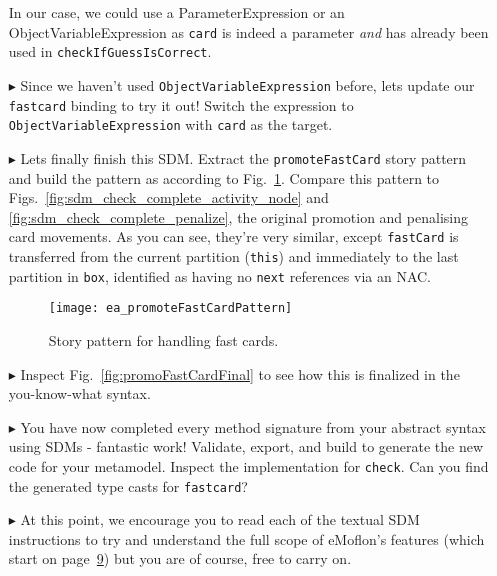 \begin{itemize}
In our case, we could use a ParameterExpression or an ObjectVariableExpression as \texttt{card} is indeed a parameter \emph{and} has already been used in
\texttt{checkIfGuessIsCorrect}. 

\vspace{0.5cm}

\item[$\blacktriangleright$] Since we haven't used \texttt{ObjectVariableExpression} before, lets update our \texttt{fastcard} binding to try it out! Switch
the expression to \texttt{Object\-Vari\-able\-Ex\-pres\-sion} with \texttt{card} as the target. 

\clearpage

\item[$\blacktriangleright$] Lets finally finish this SDM. Extract the \texttt{promoteFastCard} story pattern and build the pattern as according to
Fig.~\ref{fig:promoteFastCardPattern}. Compare this pattern to Figs.~\ref{fig:sdm_check_complete_activity_node} and \ref{fig:sdm_check_complete_penalize}, the
original promotion and penalising card movements. As you can see, they're very similar, except \texttt{fastCard} is transferred from the current partition
(\texttt{this}) and immediately to the last partition in \texttt{box}, identified as having no \texttt{next} references via an NAC.

\vspace{0.5cm}

\begin{figure}[htbp]
\begin{center}
  \texttt{[image: ea\_promoteFastCardPattern]}
  \caption{Story pattern for handling fast cards.}  
  \label{fig:promoteFastCardPattern}
\end{center}
\end{figure}

\vspace{0.5cm}

\item[$\blacktriangleright$] Inspect Fig.~\ref{fig:promoFastCardFinal} to see how this is finalized in the you-know-what syntax.

\item[$\blacktriangleright$] You have now completed every method signature from your abstract syntax using SDMs - fantastic work! Validate, export, and build to
generate the new code for your metamodel. Inspect the implementation for \texttt{check}.  Can you find the generated type casts for \texttt{fastcard}?

\item[$\blacktriangleright$] At this point, we encourage you to read each of the textual SDM instructions to try and understand the full scope of eMoflon's
features (which start on page~\hyperlink{page.9}{9}) but you are of course, free to carry on.


\end{itemize}
